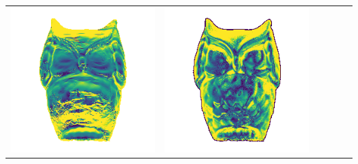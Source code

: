 \begin{tabularx}{\linewidth}{@{}Y@{}Y@{}Y@{}Y@{}Y@{}Y@{}}
\includegraphics[width=\linewidth]{semisynthetic/20150514_15_yu_err.png} &
\includegraphics[width=\linewidth]{semisynthetic/20150514_15_dpsn_err.png} &

\end{tabularx}
